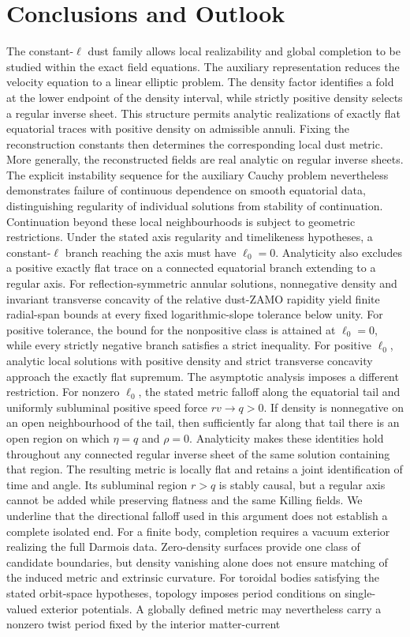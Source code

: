 \documentclass[amsmath,amsfonts,amssymb,aps,pra,superscriptaddress,10pt]{revtex4-2}
\numberwithin{equation}{section}
\theoremstyle{plain}
\theoremstyle{definition}
\theoremstyle{remark}
\theoremstyle{definition}
\newcommand{\ellzero}{\ell_0}
\begin{document}
\section{Conclusions and Outlook}

The constant-$\ell$ dust family allows local realizability and global completion to be studied within the exact field equations. The auxiliary representation reduces the velocity equation to a linear elliptic problem. The density factor identifies a fold at the lower endpoint of the density interval, while strictly positive density selects a regular inverse sheet. This structure permits analytic realizations of exactly flat equatorial traces with positive density on admissible annuli. Fixing the reconstruction constants then determines the corresponding local dust metric. More generally, the reconstructed fields are real analytic on regular inverse sheets. The explicit instability sequence for the auxiliary Cauchy problem nevertheless demonstrates failure of continuous dependence on smooth equatorial data, distinguishing regularity of individual solutions from stability of continuation. Continuation beyond these local neighbourhoods is subject to geometric restrictions. Under the stated axis regularity and timelikeness hypotheses, a constant-$\ell$ branch reaching the axis must have $\ellzero=0$. Analyticity also excludes a positive exactly flat trace on a connected equatorial branch extending to a regular axis. For reflection-symmetric annular solutions, nonnegative density and invariant transverse concavity of the relative dust-ZAMO rapidity yield finite radial-span bounds at every fixed logarithmic-slope tolerance below unity. For positive tolerance, the bound for the nonpositive class is attained at $\ellzero=0$, while every strictly negative branch satisfies a strict inequality. For positive $\ellzero$, analytic local solutions with positive density and strict transverse concavity approach the exactly flat supremum. The asymptotic analysis imposes a different restriction. For nonzero $\ellzero$, the stated metric falloff along the equatorial tail and uniformly subluminal positive speed force $rv\to q>0$. If density is nonnegative on an open neighbourhood of the tail, then sufficiently far along that tail there is an open region on which $\eta=q$ and $\rho=0$. Analyticity makes these identities hold throughout any connected regular inverse sheet of the same solution containing that region. The resulting metric is locally flat and retains a joint identification of time and angle. Its subluminal region $r>q$ is stably causal, but a regular axis cannot be added while preserving flatness and the same Killing fields. We underline that the directional falloff used in this argument does not establish a complete isolated end. For a finite body, completion requires a vacuum exterior realizing the full Darmois data. Zero-density surfaces provide one class of candidate boundaries, but density vanishing alone does not ensure matching of the induced metric and extrinsic curvature. For toroidal bodies satisfying the stated orbit-space hypotheses, topology imposes period conditions on single-valued exterior potentials. A globally defined metric may nevertheless carry a nonzero twist period fixed by the interior matter-current 
\end{document}
